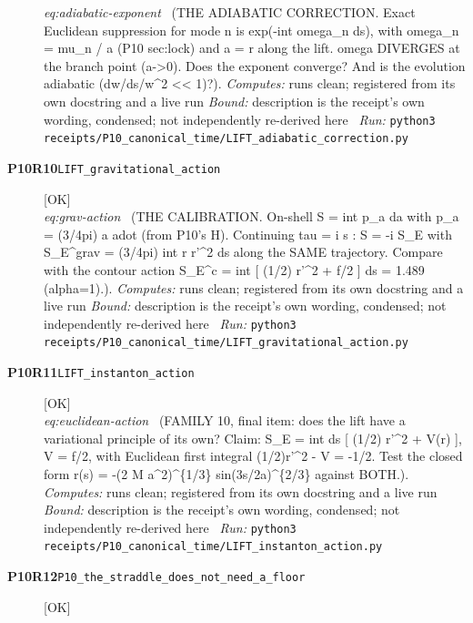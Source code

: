 \begin{description}
\textit{eq:adiabatic-exponent} \ (THE ADIABATIC CORRECTION. Exact Euclidean suppression for mode n is exp(-int omega\_n ds), with omega\_n = mu\_n / a (P10 sec:lock) and a = \textbar{}r\textbar{} along the lift. omega DIVERGES at the branch point (a->0). Does the exponent converge? And is the evolution adiabatic (\textbar{}dw/ds\textbar{}/w\textasciicircum{}2 << 1)?). 
\emph{Computes:} runs clean; registered from its own docstring and a live run
 \emph{Bound:} description is the receipt's own wording, condensed; not independently re-derived here
\ \emph{Run:} \texttt{python3 receipts/P10\_canonical\_time/LIFT\_adiabatic\_correction.py}
\item[\rcptlabel{LIFT_gravitational_action}{P10R10}\textbf{P10R10}\quad\texttt{LIFT\_gravitational\_action}]\hfill\textsf{[OK]}\\
\textit{eq:grav-action} \ (THE CALIBRATION. On-shell S = int p\_a da with p\_a = (3/4pi) a adot (from P10's H). Continuing tau = i s : S = -i S\_E with S\_E\textasciicircum{}grav = (3/4pi) int r r'\textasciicircum{}2 ds along the SAME trajectory. Compare with the contour action S\_E\textasciicircum{}c = int [ (1/2) r'\textasciicircum{}2 + f/2 ] ds = 1.489 (alpha=1).). 
\emph{Computes:} runs clean; registered from its own docstring and a live run
 \emph{Bound:} description is the receipt's own wording, condensed; not independently re-derived here
\ \emph{Run:} \texttt{python3 receipts/P10\_canonical\_time/LIFT\_gravitational\_action.py}
\item[\rcptlabel{LIFT_instanton_action}{P10R11}\textbf{P10R11}\quad\texttt{LIFT\_instanton\_action}]\hfill\textsf{[OK]}\\
\textit{eq:euclidean-action} \ (FAMILY 10, final item: does the lift have a variational principle of its own? Claim: S\_E = int ds [ (1/2) r'\textasciicircum{}2 + V(r) ], V = f/2, with Euclidean first integral (1/2)r'\textasciicircum{}2 - V = -1/2. Test the closed form r(s) = -(2 M a\textasciicircum{}2)\textasciicircum{}\{1/3\} \textbar{}sin(3s/2a)\textbar{}\textasciicircum{}\{2/3\} against BOTH.). 
\emph{Computes:} runs clean; registered from its own docstring and a live run
 \emph{Bound:} description is the receipt's own wording, condensed; not independently re-derived here
\ \emph{Run:} \texttt{python3 receipts/P10\_canonical\_time/LIFT\_instanton\_action.py}
\item[\rcptlabel{P10_the_straddle_does_not_need_a_floor}{P10R12}\textbf{P10R12}\quad\texttt{P10\_the\_straddle\_does\_not\_need\_a\_floor}]\hfill\textsf{[OK]}\\

\end{description}
